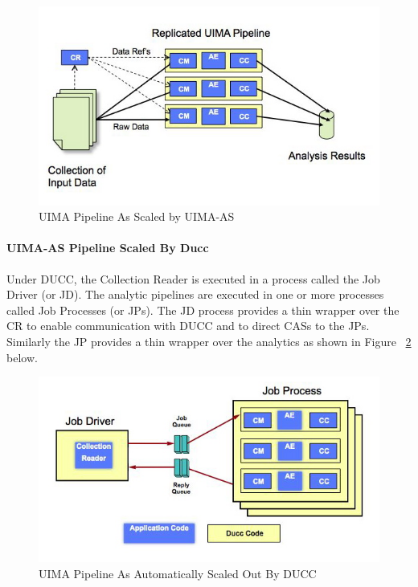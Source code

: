    \begin{figure}[H]
      \centering
      \includegraphics[bb=0 0 584 341, width=5.5in]{images/uima-as-pipeline.jpg}
      \caption{UIMA Pipeline As Scaled by UIMA-AS}
      \label{UIMA-AS-pipeline}
    \end{figure}

    \paragraph{UIMA-AS Pipeline Scaled By Ducc}
    Under DUCC, the Collection Reader is executed in a process called the Job Driver (or JD). The 
    analytic pipelines are executed in one or more processes called Job Processes (or JPs). The JD 
    process provides a thin wrapper over the CR to enable communication with DUCC and to direct 
    CASs to the JPs. Similarly the JP provides a thin wrapper over the analytics as shown in Figure 
    ~\ref{UIMA-AS-pipeline-DUCC} below.

    \begin{figure}[H]
      \centering
      \includegraphics[bb=0 0 571 311, width=5.5in]{images/ducc-sequential.jpg}
      \caption{UIMA Pipeline As Automatically Scaled Out By DUCC}
      \label{UIMA-AS-pipeline-DUCC}
    \end{figure}

